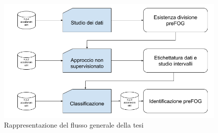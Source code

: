 
\begin{figure}[]
	\centering
	\includegraphics[scale=0.46]{images/FlussoTesiGenerale.png}
	\caption{Rappresentazione del flusso generale della tesi}
	\label{FlussoTesiGenerale}
\end{figure}
